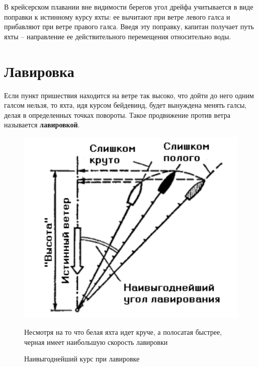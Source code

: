 \documentclass[a4paper, 12pt, twoside, final]{scrbook}
\begin{document}
В крейсерском плавании вне видимости берегов угол дрейфа учитывается в виде поправки к истинному курсу яхты: ее вычитают при ветре левого галса и прибавляют при ветре правого галса. Введя эту поправку, капитан получает путь яхты \--- направление ее действительного перемещения относительно воды.

\section{Лавировка}

Если пункт пришествия находится на ветре так высоко, что дойти до него одним галсом нельзя, то яхта, идя курсом бейдевинд, будет вынуждена менять галсы, делая в определенных точках повороты. Такое продвижение против ветра называется \textbf{лавировкой}.

\begin{figure}
	\centering
	\includegraphics[scale=1]{106_Naivygod_kurs_pri_lavirovke}
	\caption{Наивыгоднейший курс при лавировке}
	\label{fig:106}
	\centering\small
	Несмотря на то что белая яхта идет круче, а полосатая быстрее, черная имеет наибольшую скорость лавировки
\end{figure}
\end{document}
